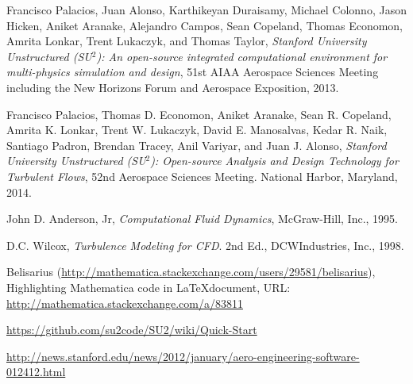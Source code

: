 \documentclass[10pt, titlepage]{article}
\begin{document}
\newpage
\begin{thebibliography}{9}

Francisco Palacios, Juan Alonso, Karthikeyan Duraisamy, Michael Colonno, Jason Hicken, Aniket Aranake, Alejandro Campos, Sean Copeland, Thomas Economon, Amrita Lonkar, Trent Lukaczyk, and Thomas Taylor, \emph{Stanford University Unstructured (SU$^2$): An open-source integrated computational environment for multi-physics simulation and design}, 51st AIAA Aerospace Sciences Meeting including the New Horizons Forum and Aerospace Exposition, 2013.

Francisco Palacios, Thomas D. Economon, Aniket Aranake, Sean R. Copeland, Amrita K. Lonkar, Trent W. Lukaczyk, David E. Manosalvas, Kedar R. Naik, Santiago Padron, Brendan Tracey, Anil Variyar, and Juan J. Alonso, \emph{Stanford University Unstructured (SU$^2$): Open-source Analysis and Design Technology for Turbulent Flows}, 52nd Aerospace Sciences Meeting. National Harbor, Maryland, 2014.

John D. Anderson, Jr, \emph{Computational Fluid Dynamics}, McGraw-Hill, Inc., 1995.

D.C. Wilcox, \emph{Turbulence Modeling for CFD}. 2nd Ed., DCWIndustries, Inc., 1998.

Belisarius (\url{http://mathematica.stackexchange.com/users/29581/belisarius}), Highlighting Mathematica code in \LaTeX document, URL: \url{http://mathematica.stackexchange.com/a/83811}

\url{https://github.com/su2code/SU2/wiki/Quick-Start}

\url{http://news.stanford.edu/news/2012/january/aero-engineering-software-012412.html}

\end{thebibliography}
\end{document}
